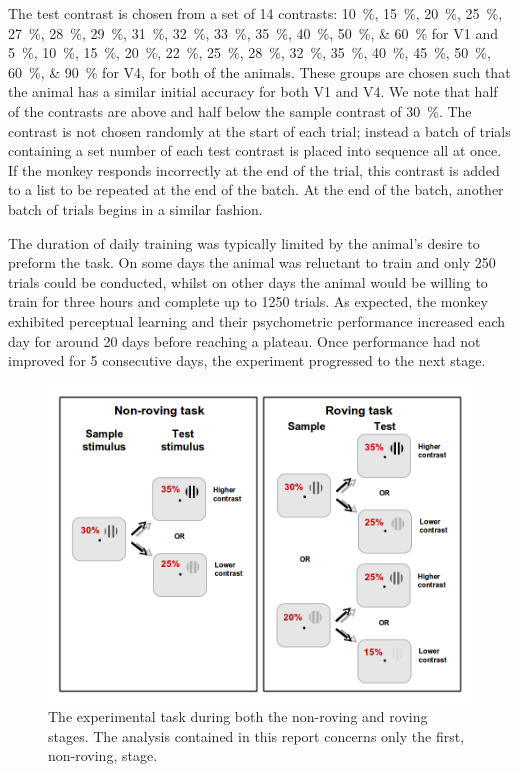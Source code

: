 The test contrast is chosen from a set of 14 contrasts:
\SIlist[list-units = brackets]{10;15;20;25;27;28;29;31;32;33;35;40;50;60}{\percent} for \ac{V1} and
\SIlist[list-units = brackets]{5;10;15;20;22;25;28;32;35;40;45;50;60;90}{\percent} for \ac{V4},
for both of the animals.
These groups are chosen such that the animal has a similar initial accuracy for both \ac{V1} and \ac{V4}.
We note that half of the contrasts are above and half below the sample contrast of \SI{30}{\percent}.
The contrast is not chosen randomly at the start of each trial; instead a batch of trials containing a set number of each test contrast is placed into sequence all at once.
If the monkey responds incorrectly at the end of the trial, this contrast is added to a list to be repeated at the end of the batch.
At the end of the batch, another batch of trials begins in a similar fashion.

The duration of daily training was typically limited by the animal's desire to preform the task.
On some days the animal was reluctant to train and only 250 trials could be conducted, whilst on other days the animal would be willing to train for three hours and complete up to 1250 trials.
As expected, the monkey exhibited perceptual learning and their psychometric performance increased each day for around 20 days before reaching a plateau.
Once performance had not improved for 5 consecutive days, the experiment progressed to the next stage.


\begin{figure}[htbp]
\begin{center}
\includegraphics[width=0.8\linewidth]{./figs/info/PLtask2.png}
\end{center}
\caption{The experimental task during both the non-roving and roving stages.
The analysis contained in this report concerns only the first, non-roving, stage.}
\label{fig:pltask2}
\end{figure}

